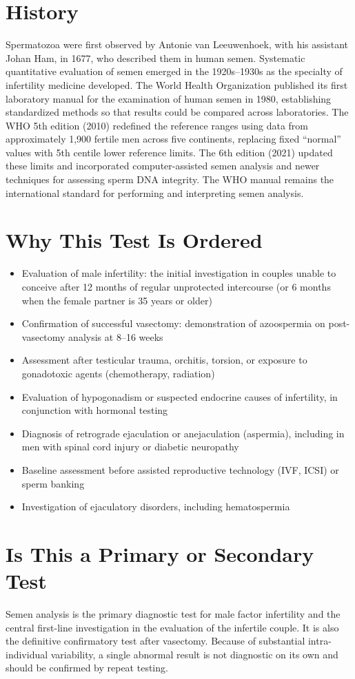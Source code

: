 \section*{History}
Spermatozoa were first observed by Antonie van Leeuwenhoek, with his assistant Johan Ham, in 1677, who described them in human semen. Systematic quantitative evaluation of semen emerged in the 1920s--1930s as the specialty of infertility medicine developed. The World Health Organization published its first laboratory manual for the examination of human semen in 1980, establishing standardized methods so that results could be compared across laboratories. The WHO 5th edition (2010) redefined the reference ranges using data from approximately 1,900 fertile men across five continents, replacing fixed ``normal'' values with 5th centile lower reference limits. The 6th edition (2021) updated these limits and incorporated computer-assisted semen analysis and newer techniques for assessing sperm DNA integrity. The WHO manual remains the international standard for performing and interpreting semen analysis.
\section*{Why This Test Is Ordered}
\begin{itemize}
  \item Evaluation of male infertility: the initial investigation in couples unable to conceive after 12 months of regular unprotected intercourse (or 6 months when the female partner is 35 years or older)
  \item Confirmation of successful vasectomy: demonstration of azoospermia on post-vasectomy analysis at 8--16 weeks
  \item Assessment after testicular trauma, orchitis, torsion, or exposure to gonadotoxic agents (chemotherapy, radiation)
  \item Evaluation of hypogonadism or suspected endocrine causes of infertility, in conjunction with hormonal testing
  \item Diagnosis of retrograde ejaculation or anejaculation (aspermia), including in men with spinal cord injury or diabetic neuropathy
  \item Baseline assessment before assisted reproductive technology (IVF, ICSI) or sperm banking
  \item Investigation of ejaculatory disorders, including hematospermia
\end{itemize}
\section*{Is This a Primary or Secondary Test}
Semen analysis is the primary diagnostic test for male factor infertility and the central first-line investigation in the evaluation of the infertile couple. It is also the definitive confirmatory test after vasectomy. Because of substantial intra-individual variability, a single abnormal result is not diagnostic on its own and should be confirmed by repeat testing.

